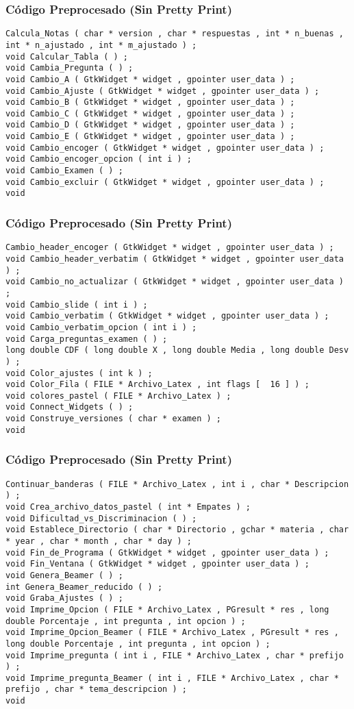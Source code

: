 \documentclass{beamer}
\begin{document}
\begin{frame}[fragile]
\frametitle{C\'odigo Preprocesado (Sin Pretty Print)}
\begin{lstlisting}[style=CStyle]
Calcula_Notas ( char * version , char * respuestas , int * n_buenas , int * n_ajustado , int * m_ajustado ) ; 
void Calcular_Tabla ( ) ; 
void Cambia_Pregunta ( ) ; 
void Cambio_A ( GtkWidget * widget , gpointer user_data ) ; 
void Cambio_Ajuste ( GtkWidget * widget , gpointer user_data ) ; 
void Cambio_B ( GtkWidget * widget , gpointer user_data ) ; 
void Cambio_C ( GtkWidget * widget , gpointer user_data ) ; 
void Cambio_D ( GtkWidget * widget , gpointer user_data ) ; 
void Cambio_E ( GtkWidget * widget , gpointer user_data ) ; 
void Cambio_encoger ( GtkWidget * widget , gpointer user_data ) ; 
void Cambio_encoger_opcion ( int i ) ; 
void Cambio_Examen ( ) ; 
void Cambio_excluir ( GtkWidget * widget , gpointer user_data ) ; 
void \end{lstlisting}
\end{frame}
\begin{frame}[fragile]
\frametitle{C\'odigo Preprocesado (Sin Pretty Print)}
\begin{lstlisting}[style=CStyle]
Cambio_header_encoger ( GtkWidget * widget , gpointer user_data ) ; 
void Cambio_header_verbatim ( GtkWidget * widget , gpointer user_data ) ; 
void Cambio_no_actualizar ( GtkWidget * widget , gpointer user_data ) ; 
void Cambio_slide ( int i ) ; 
void Cambio_verbatim ( GtkWidget * widget , gpointer user_data ) ; 
void Cambio_verbatim_opcion ( int i ) ; 
void Carga_preguntas_examen ( ) ; 
long double CDF ( long double X , long double Media , long double Desv ) ; 
void Color_ajustes ( int k ) ; 
void Color_Fila ( FILE * Archivo_Latex , int flags [  16 ] ) ; 
void colores_pastel ( FILE * Archivo_Latex ) ; 
void Connect_Widgets ( ) ; 
void Construye_versiones ( char * examen ) ; 
void \end{lstlisting}
\end{frame}
\begin{frame}[fragile]
\frametitle{C\'odigo Preprocesado (Sin Pretty Print)}
\begin{lstlisting}[style=CStyle]
Continuar_banderas ( FILE * Archivo_Latex , int i , char * Descripcion ) ; 
void Crea_archivo_datos_pastel ( int * Empates ) ; 
void Dificultad_vs_Discriminacion ( ) ; 
void Establece_Directorio ( char * Directorio , gchar * materia , char * year , char * month , char * day ) ; 
void Fin_de_Programa ( GtkWidget * widget , gpointer user_data ) ; 
void Fin_Ventana ( GtkWidget * widget , gpointer user_data ) ; 
void Genera_Beamer ( ) ; 
int Genera_Beamer_reducido ( ) ; 
void Graba_Ajustes ( ) ; 
void Imprime_Opcion ( FILE * Archivo_Latex , PGresult * res , long double Porcentaje , int pregunta , int opcion ) ; 
void Imprime_Opcion_Beamer ( FILE * Archivo_Latex , PGresult * res , long double Porcentaje , int pregunta , int opcion ) ; 
void Imprime_pregunta ( int i , FILE * Archivo_Latex , char * prefijo ) ; 
void Imprime_pregunta_Beamer ( int i , FILE * Archivo_Latex , char * prefijo , char * tema_descripcion ) ; 
void \end{lstlisting}
\end{frame}
\end{document}
